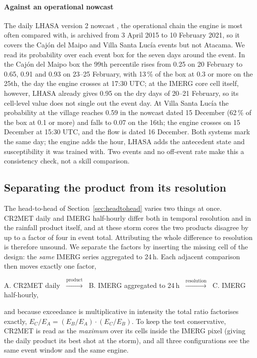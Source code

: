 \documentclass[authoryear,preprint,review,12pt]{elsarticle}
\begin{document}
\paragraph{Against an operational nowcast}
The daily LHASA version 2 nowcast \citep{stanley2021,lhasa2023data}, the operational
chain the engine is most often compared with, is archived from 3 April 2015 to
10 February 2021, so it covers the Caj\'on del Maipo and Villa Santa Luc\'ia events
but not Atacama. We read its probability over each event box for the seven days
around the event. In the Caj\'on del Maipo box the 99th percentile rises from 0.25
on 20 February to 0.65, 0.91 and 0.93 on 23--25 February, with 13\,\% of the box at
0.3 or more on the 25th, the day the engine crosses at 17:30 UTC; at the IMERG core
cell itself, however, LHASA already gives 0.95 on the dry days of 20--21 February, so
its cell-level value does not single out the event day. At Villa Santa Luc\'ia the
probability at the village reaches 0.59 in the nowcast dated 15 December (62\,\% of the
box at 0.1 or more) and falls to 0.07 on the 16th; the engine crosses on 15 December
at 15:30 UTC, and the flow is dated 16 December. Both systems mark the same day; the
engine adds the hour, LHASA adds the antecedent state and susceptibility it was
trained with. Two events and no off-event rate make this a consistency check, not a
skill comparison.

\subsection{Separating the product from its resolution}
\label{sec:singlefactor}

The head-to-head of Section~\ref{sec:headtohead} varies two things at once. CR2MET
daily and IMERG half-hourly differ both in temporal resolution and in the rainfall
product itself, and at these storm cores the two products disagree by up to a
factor of four in event total. Attributing the whole difference to resolution is
therefore unsound. We separate the factors by inserting the missing cell of the
design: the \emph{same} IMERG series aggregated to 24\,h. Each adjacent comparison
then moves exactly one factor,
\begin{center}
A. CR2MET daily $\;\xrightarrow{\text{product}}\;$ B. IMERG aggregated to 24\,h
$\;\xrightarrow{\text{resolution}}\;$ C. IMERG half-hourly,
\end{center}
and because exceedance is multiplicative in intensity the total ratio factorises
exactly, $E_C/E_A = (E_B/E_A)\cdot(E_C/E_B)$. To keep the test conservative, CR2MET
is read as the \emph{maximum} over its cells inside the IMERG pixel (giving the
daily product its best shot at the storm), and all three configurations see the same
event window and the same engine.
\end{document}
